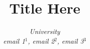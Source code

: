 \documentclass[conference]{IEEEtran}
\begin{document}
\title{Title Here}

\author{
\textit{University}\\
\textit{email 1$^{1}$, email 2$^{2}$, email 3$^{3}$}}

  \maketitle
\end{document}
